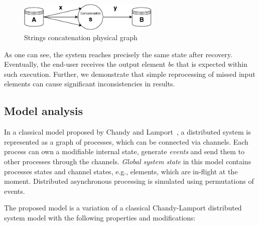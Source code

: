 \begin{figure}[t]
  \centering
  \includegraphics[width=0.6\textwidth]{Chapters/DeliveryGuarantees/pics/concat.pdf}
  \caption{Strings concatenation physical graph}
  \label{concat}
\end{figure}

As one can see, the system reaches precisely the same state after recovery. Eventually, the end-user receives the output element {\em be} that is expected within such execution. Further, we demonstrate that simple reprocessing of missed input elements can cause significant inconsistencies in results.

\subsection{Model analysis}

In a classical model proposed by Chandy and Lamport~\cite{Chandy:1985:DSD:214451.214456}, a distributed system is represented as a graph of processes, which can be connected via channels. Each process can own a modifiable internal state, generate {\em events} and send them to other processes through the channels. {\em Global system state} in this model contains processes states and channel states, e.g., elements, which are in-flight at the moment. Distributed asynchronous processing is simulated using permutations of events.

The proposed model is a variation of a classical Chandy-Lamport distributed system model with the following properties and modifications:

